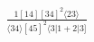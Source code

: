 \documentclass[varwidth, border=5pt]{standalone}
\begin{document}
\begin{my}
$\begin{gathered}
\scriptscriptstyle\frac{1[14][34]^2⟨23⟩}{⟨34⟩[45]^2⟨3|1+2|3]}
\end{gathered}$
\end{my}
\end{document}
